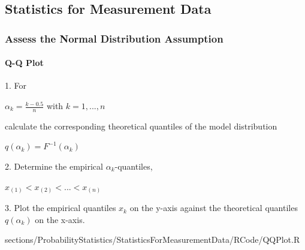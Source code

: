 \subsection{Statistics for Measurement Data}
	\subsubsection{Assess the Normal Distribution Assumption}
		\paragraph{Q-Q Plot}
				\RTheory
				{					
					1. For
					\begin{center}
						$\alpha_k=\frac{k-0.5}{n}$ with $k=1,...,n$\\
					\end{center}
					
					calculate the corresponding theoretical quantiles of the model distribution
					
					\begin{center}
						$q(\alpha_k)=F^{-1}(\alpha_k)$\\
					\end{center}				 
					
					2. Determine the empirical $\alpha_k$-quantiles,
					
					\begin{center}
						$x_{(1)}<x_{(2)}<...<x_{(n)}$\\
					\end{center}				 
					
					3. Plot the empirical quantiles $x_k$ on the y-axis against the theoretical quantiles 					$q(\alpha_k)$ on the x-axis.		 
				}
				{
					sections/ProbabilityStatistics/StatisticsForMeasurementData/RCode/QQPlot.R
				}
				

